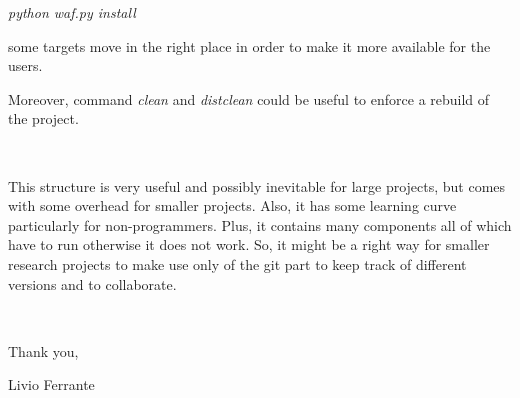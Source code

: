 \documentclass[11pt]{article}
\begin{document}
{\raggedright
\textit{{\small python waf.py install}}
}

{\raggedright
{\small some targets move in the right place in order to make it more available for the users.}
}

{\raggedright
{\small Moreover, command \textit{clean} and \textit{distclean} could be useful to enforce a rebuild of the project. }
}\\

{\raggedright
{\small This structure is very useful and possibly inevitable for large projects, but comes with some overhead for smaller projects. Also, it has some learning curve particularly for non-programmers. Plus, it contains many components all of which have to run otherwise it does not work. 
So, it might be a right way for smaller research projects to make use only of the git part to keep track of different versions and to collaborate. }
}\\

{\raggedright
{\small Thank you,}
}

{\raggedright
{\small Livio Ferrante}
}
\end{document}

